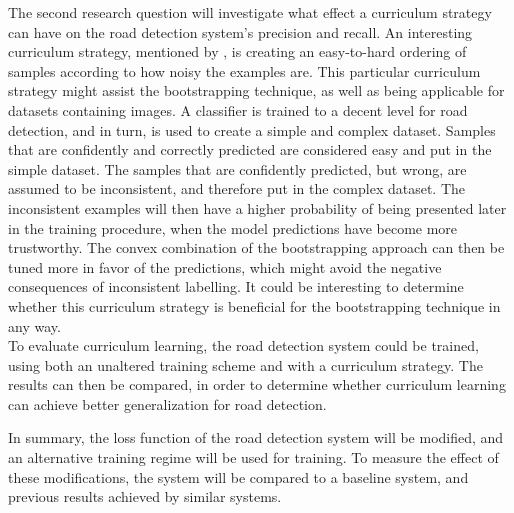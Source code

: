 The second research question will investigate what effect a curriculum strategy can have on the road detection system's precision and recall. An interesting curriculum strategy, mentioned by \cite{Bengio_curriculumlearning}, is creating an easy-to-hard ordering of samples according to how noisy the examples are. This particular curriculum strategy might assist the bootstrapping technique, as well as being applicable for datasets containing images. A classifier is trained to a decent level for road detection, and in turn, is used to create a simple and complex dataset. Samples that are confidently and correctly predicted are considered easy and put in the simple dataset. The samples that are confidently predicted, but wrong, are assumed to be inconsistent, and therefore put in the complex dataset. The inconsistent examples will then have a higher probability of being presented later in the training procedure, when the model predictions have become more trustworthy. The convex combination of the bootstrapping approach can then be tuned more in favor of the predictions, which might avoid the negative consequences of inconsistent labelling.  It could be interesting to determine whether this curriculum strategy is beneficial for the bootstrapping technique in any way. \\

To evaluate curriculum learning, the road detection system could be trained, using both an unaltered training scheme and with a curriculum strategy. The results can then be compared, in order to determine whether curriculum learning can achieve better generalization for road detection.\\


In summary, the loss function of the road detection system will be modified, and an alternative training regime will be used for training. To measure the effect of these modifications, the system will be compared to a baseline system, and previous results achieved by similar systems.